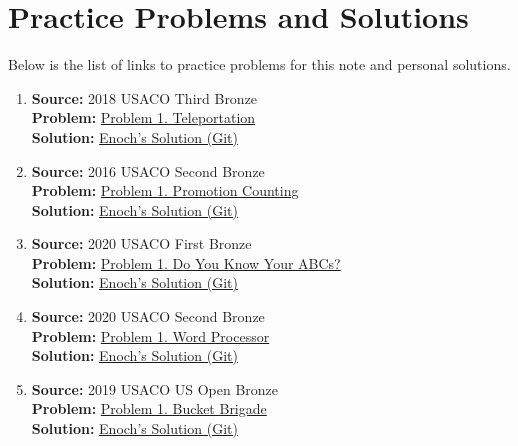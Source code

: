 \documentclass[../../../main.tex]{subfiles}
\begin{document}
\section{Practice Problems and Solutions}

Below is the list of links to practice problems for this note
and personal solutions.

\begin{enumerate}
\item
\textbf{Source:} 2018 USACO Third Bronze \\
\textbf{Problem:}
\href{https://usaco.org/index.php?page=viewproblem2\&cpid=807}{Problem 1. Teleportation} \\
\textbf{Solution:}
\href{https://github.com/enochness/Archive/blob/main/B/cpp/B26110.cpp}{Enoch's Solution (Git)}

\item
\textbf{Source:} 2016 USACO Second Bronze \\
\textbf{Problem:}
\href{https://usaco.org/index.php?page=viewproblem2\&cpid=591}{Problem 1. Promotion Counting} \\
\textbf{Solution:}
\href{https://github.com/enochness/Archive/blob/main/B/cpp/B26111.cpp}{Enoch's Solution (Git)}

\item
\textbf{Source:} 2020 USACO First Bronze \\
\textbf{Problem:}
\href{https://usaco.org/index.php?page=viewproblem2\&cpid=1059}{Problem 1. Do You Know Your ABCs?} \\
\textbf{Solution:}
\href{https://github.com/enochness/Archive/blob/main/B/cpp/B26112.cpp}{Enoch's Solution (Git)}

\item
\textbf{Source:} 2020 USACO Second Bronze \\
\textbf{Problem:}
\href{https://usaco.org/index.php?page=viewproblem2\&cpid=987}{Problem 1. Word Processor} \\
\textbf{Solution:}
\href{https://github.com/enochness/Archive/blob/main/B/cpp/B26113.cpp}{Enoch's Solution (Git)}

\item
\textbf{Source:} 2019 USACO US Open Bronze \\
\textbf{Problem:}
\href{https://usaco.org/index.php?page=viewproblem2\&cpid=939}{Problem 1. Bucket Brigade} \\
\textbf{Solution:}
\href{https://github.com/enochness/Archive/blob/main/B/cpp/B26114.cpp}{Enoch's Solution (Git)}


\end{enumerate}
\end{document}
